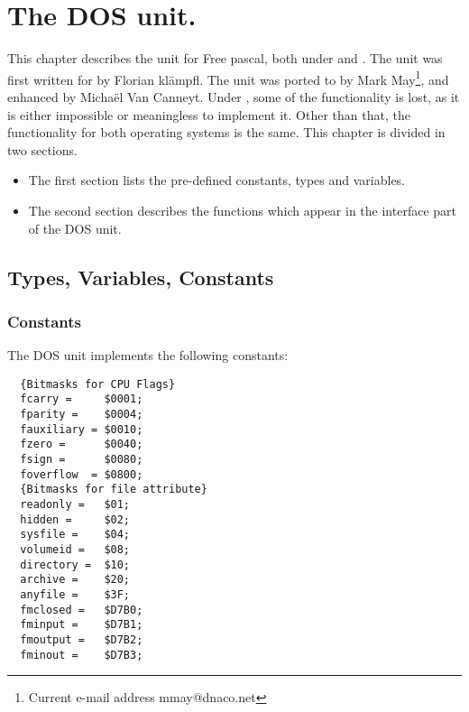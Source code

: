 %
%
%
%
%
\chapter{The DOS unit.}
This chapter describes the  unit for Free pascal, both under \dos
and \linux. The unit was first written for \dos by Florian kl\"ampfl. 
The unit was ported to \linux by Mark May\footnote{Current
e-mail address \textsf{mmay@dnaco.net}}, and enhanced by Micha\"el Van
Canneyt.
Under \linux, some of the functionality is lost, as it is either impossible 
or meaningless to implement it. Other than that, 
the functionality for both operating systems is the same.
This chapter is divided in two sections. 
\begin{itemize}
\item The first section lists the pre-defined constants, types and variables. 
\item The second section describes the functions which appear in the
interface part of the DOS unit.
\end{itemize}
\section{Types, Variables, Constants}
\subsection {Constants}
The DOS unit implements the following constants:
\begin{verbatim}
  {Bitmasks for CPU Flags}
  fcarry =     $0001;
  fparity =    $0004;
  fauxiliary = $0010;
  fzero =      $0040;
  fsign =      $0080;
  foverflow  = $0800;
  {Bitmasks for file attribute}
  readonly =   $01;
  hidden =     $02;
  sysfile =    $04;
  volumeid =   $08;
  directory =  $10;
  archive =    $20;
  anyfile =    $3F;
  fmclosed =   $D7B0;
  fminput =    $D7B1;
  fmoutput =   $D7B2;
  fminout =    $D7B3;
\end{verbatim}
